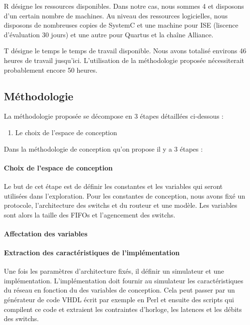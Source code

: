 \documentclass[11pt]{article}
\begin{document}
R désigne les ressources disponibles. Dans notre cas, nous sommes 4 et disposons d'un certain nombre de machines. Au niveau des ressources logicielles, nous disposons de nombreuses copies de SystemC et une machine pour ISE (liscence d'évaluation 30 jours) et une autre pour Quartus et la chaîne Alliance.

T désigne le temps le temps de travail disponible. Nous avons totalisé environs 46 heures de travail jusqu'ici. L'utilisation de la méthodologie proposée nécessiterait probablement encore 50 heures.

\subsection{Méthodologie}

La méthodologie proposée se décompose en 3 étapes détaillées ci-dessous :
\begin{enumerate}
\item Le choix de l'espace de conception
\end{enumerate}

Dans la méthodologie de conception qu'on propose il y a 3 étapes : 
\paragraph{Choix de l'espace de conception}
Le but de cet étape est de définir les constantes et les variables qui seront utilisées dans l'exploration. Pour les constantes de conception, nous avons fixé un protocole, l'architecture des switchs et du routeur et une modèle. Les variables sont alors la taille des FIFOs et l'agencement des switchs.

\paragraph{Affectation des variables}

\paragraph{Extraction des caractéristiques de l'implémentation}
Une fois les paramètres d'architecture fixés, il définir un simulateur et une implémentation. L'implémentation doit fournir au simulateur les caractéristiques du réseau en fonction du des variables de conception. Cela peut passer par un générateur de code VHDL écrit par exemple en Perl et ensuite des scripts qui compilent ce code et extraient les contraintes d'horloge, les latences et les débits des switchs.
\end{document}
